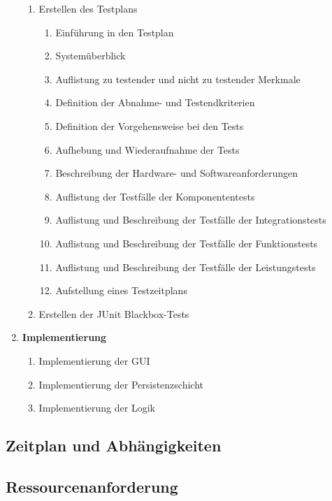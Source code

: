 \documentclass[fontsize=12pt,paper=a4,twoside]{scrartcl}
\begin{document}
\begin{enumerate}
\begin{enumerate}[label={(\arabic*)}]
		\item Erstellen des Testplans
			\begin{enumerate}[label={(\arabic*)}]
			\item Einführung in den Testplan
			\item Systemüberblick
			\item Auflistung zu testender und nicht zu testender Merkmale
			\item Definition der Abnahme- und Testendkriterien
			\item Definition der Vorgehensweise bei den Tests
			\item Aufhebung und Wiederaufnahme der Tests
			\item Beschreibung der Hardware- und Softwareanforderungen
			\item Auflistung der Testfälle der Komponententests
			\item Auflistung und Beschreibung der Testfälle der Integrationstests
			\item Auflistung und Beschreibung der Testfälle der Funktionstests
			\item Auflistung und Beschreibung der Testfälle der Leistungstests
			\item Aufstellung eines Testzeitplans
			\end{enumerate}
		\item Erstellen der JUnit Blackbox-Tests
		\end{enumerate}
\item \textbf{Implementierung}
		\begin{enumerate}[label={(\arabic*)}]
		\item Implementierung der GUI
		\item Implementierung der Persistenzschicht
		\item Implementierung der Logik
		\end{enumerate}	
\end{enumerate}

\subsection{Zeitplan und Abhängigkeiten}


\subsection{Ressourcenanforderung}
\end{document}
